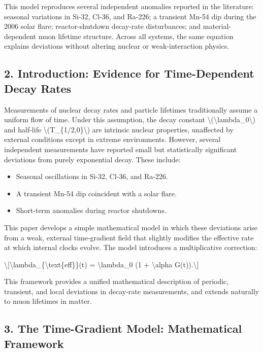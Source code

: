 \documentclass[
  10pt,
]{article}
\providecommand{\tightlist}{%
  \setlength{\itemsep}{0pt}\setlength{\parskip}{0pt}}
\begin{document}
This model reproduces several independent anomalies reported in the
literature: seasonal variations in Si-32, Cl-36, and Ra-226; a transient
Mn-54 dip during the 2006 solar flare; reactor-shutdown decay-rate
disturbances; and material-dependent muon lifetime structure. Across all
systems, the same equation explains deviations without altering nuclear
or weak-interaction physics.

\hypertarget{introduction-evidence-for-time-dependent-decay-rates}{%
\subsection{2. Introduction: Evidence for Time-Dependent Decay
Rates}\label{introduction-evidence-for-time-dependent-decay-rates}}

Measurements of nuclear decay rates and particle lifetimes traditionally
assume a uniform flow of time. Under this assumption, the decay constant
\textbackslash(\textbackslash lambda\_0\textbackslash) and half-life
\textbackslash(T\_\{1/2,0\}\textbackslash) are intrinsic nuclear
properties, unaffected by external conditions except in extreme
environments. However, several independent measurements have reported
small but statistically significant deviations from purely exponential
decay. These include:

\begin{itemize}
\tightlist
\item
  Seasonal oscillations in Si-32, Cl-36, and Ra-226.
\item
  A transient Mn-54 dip coincident with a solar flare.
\item
  Short-term anomalies during reactor shutdowns.
\end{itemize}

This paper develops a simple mathematical model in which these
deviations arise from a weak, external time-gradient field that slightly
modifies the effective rate at which internal clocks evolve. The model
introduces a multiplicative correction:

\textbackslash{[}\textbackslash lambda\_\{\textbackslash text\{eff\}\}(t)
= \textbackslash lambda\_0 (1 + \textbackslash alpha
G(t)).\textbackslash{]}

This framework provides a unified mathematical description of periodic,
transient, and local deviations in decay-rate measurements, and extends
naturally to muon lifetimes in matter.

\hypertarget{the-time-gradient-model-mathematical-framework}{%
\subsection{3. The Time-Gradient Model: Mathematical
Framework}\label{the-time-gradient-model-mathematical-framework}}
\end{document}
